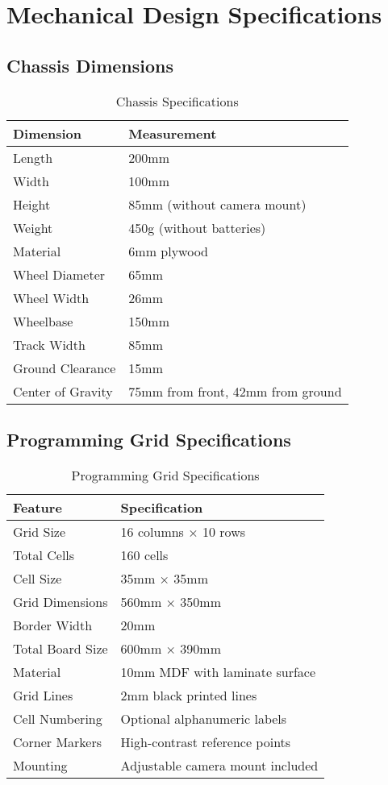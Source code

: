 \section{Mechanical Design Specifications}

\subsection{Chassis Dimensions}

\begin{table}[H]
\centering
\caption{Chassis Specifications}
\begin{tabular}{|l|l|}
\hline
\textbf{Dimension} & \textbf{Measurement} \\
\hline
Length & 200mm \\
Width & 100mm \\
Height & 85mm (without camera mount) \\
Weight & 450g (without batteries) \\
Material & 6mm plywood \\
Wheel Diameter & 65mm \\
Wheel Width & 26mm \\
Wheelbase & 150mm \\
Track Width & 85mm \\
Ground Clearance & 15mm \\
Center of Gravity & 75mm from front, 42mm from ground \\
\hline
\end{tabular}
\label{tab:chassis}
\end{table}

\subsection{Programming Grid Specifications}

\begin{table}[H]
\centering
\caption{Programming Grid Specifications}
\begin{tabular}{|l|l|}
\hline
\textbf{Feature} & \textbf{Specification} \\
\hline
Grid Size & 16 columns × 10 rows \\
Total Cells & 160 cells \\
Cell Size & 35mm × 35mm \\
Grid Dimensions & 560mm × 350mm \\
Border Width & 20mm \\
Total Board Size & 600mm × 390mm \\
Material & 10mm MDF with laminate surface \\
Grid Lines & 2mm black printed lines \\
Cell Numbering & Optional alphanumeric labels \\
Corner Markers & High-contrast reference points \\
Mounting & Adjustable camera mount included \\
\hline
\end{tabular}
\label{tab:grid}
\end{table}

